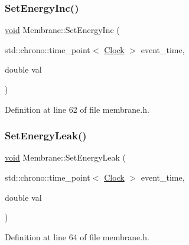 \mbox{\label{class_membrane_abd1c69b9b0260799afd3965c34f881ff}} 
\subsubsection{\texorpdfstring{Set\+Energy\+Inc()}{SetEnergyInc()}}
{\footnotesize\ttfamily \mbox{\hyperlink{glad_8h_a950fc91edb4504f62f1c577bf4727c29}{void}} Membrane\+::\+Set\+Energy\+Inc (\begin{DoxyParamCaption}\item[{std\+::chrono\+::time\+\_\+point$<$ \mbox{\hyperlink{universe_8h_a0ef8d951d1ca5ab3cfaf7ab4c7a6fd80}{Clock}} $>$}]{event\+\_\+time,  }\item[{double}]{val }\end{DoxyParamCaption})\hspace{0.3cm}{\ttfamily [inline]}}



Definition at line 62 of file membrane.\+h.

\mbox{\label{class_membrane_a96618ef2c05a8af5d6bd8606c9b8eae8}} 
\subsubsection{\texorpdfstring{Set\+Energy\+Leak()}{SetEnergyLeak()}}
{\footnotesize\ttfamily \mbox{\hyperlink{glad_8h_a950fc91edb4504f62f1c577bf4727c29}{void}} Membrane\+::\+Set\+Energy\+Leak (\begin{DoxyParamCaption}\item[{std\+::chrono\+::time\+\_\+point$<$ \mbox{\hyperlink{universe_8h_a0ef8d951d1ca5ab3cfaf7ab4c7a6fd80}{Clock}} $>$}]{event\+\_\+time,  }\item[{double}]{val }\end{DoxyParamCaption})\hspace{0.3cm}{\ttfamily [inline]}}



Definition at line 64 of file membrane.\+h.

\mbox{\label{class_membrane_a6d0b96fb6d823cc113dd56b8889b1544}} 
